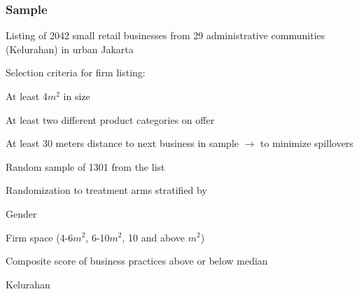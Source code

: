 \documentclass[hideothersubsections, usenames,dvipsnames,10pt]{beamer}
\newenvironment{itemize_3pt}{\itemize\addtolength{\itemsep}{3pt}}{\enditemize}
\begin{document}
\begin{frame}
\frametitle{Sample}
\begin{itemize_3pt}
\item Listing of 2042 small retail businesses from 29 administrative communities (Kelurahan) in urban Jakarta
\item Selection criteria for firm listing:
	\begin{itemize_3pt}
	\item At least 4$m^{2}$ in size
	\item At least two different product categories on offer
	\item At least 30 meters distance to next business in sample $\rightarrow$ to minimize spillovers
	\end{itemize_3pt}
\item Random sample of 1301 from the list
\item Randomization to treatment arms stratified by
	\begin{itemize_3pt}
	\item Gender
	\item Firm space (4-6$m^2$, 6-10$m^2$, 10 and above $m^2$)
	\item Composite score of business practices above or below median
	\item Kelurahan
	\end{itemize_3pt}
\end{itemize_3pt}
\end{frame}
\end{document}
